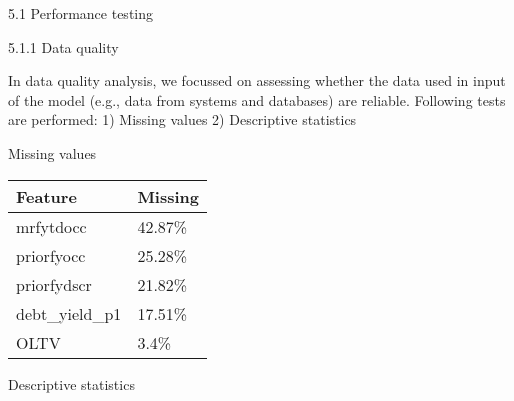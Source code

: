 5.1 Performance testing

5.1.1 Data quality

In data quality analysis, we focussed on assessing whether the data used
in input of the model (e.g., data from systems and databases) are
reliable. Following tests are performed: 1) Missing values 2)
Descriptive statistics

Missing values

\begin{longtable}[]{@{}ll@{}}
\toprule
Feature & Missing\tabularnewline
\midrule
\endhead
mrfytdocc & 42.87\%\tabularnewline
priorfyocc & 25.28\%\tabularnewline
priorfydscr & 21.82\%\tabularnewline
debt\_yield\_p1 & 17.51\%\tabularnewline
OLTV & 3.4\%\tabularnewline
\bottomrule
\end{longtable}

Descriptive statistics

